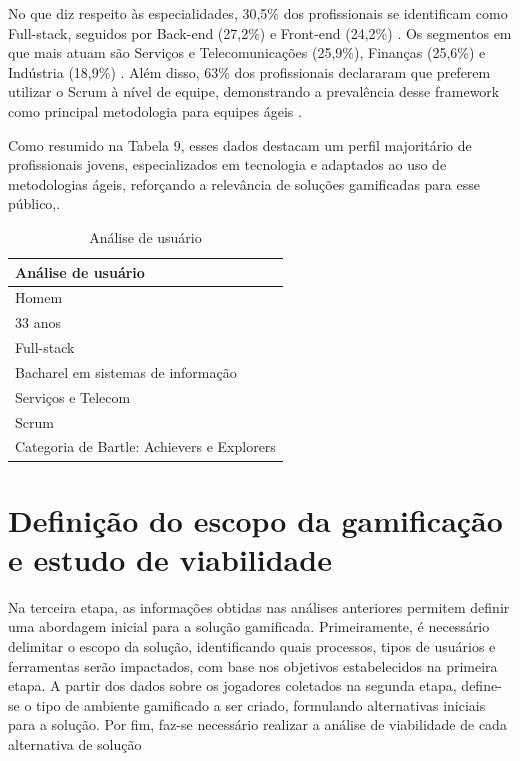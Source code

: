 \documentclass[
	12pt,
	openright,
	twoside,
	a4paper,
	english,
	brazil
	]{abntex2}
\begin{document}
No que diz respeito às especialidades, 30,5\% dos profissionais se identificam como Full-stack, seguidos por Back-end (27,2\%) e Front-end (24,2\%) \cite{revelo2021tecnologia}. Os segmentos em que mais atuam são Serviços e Telecomunicações (25,9\%), Finanças (25,6\%) e Indústria (18,9\%) \cite{abes2023mercado}. Além disso, 63\% dos profissionais declararam que preferem utilizar o Scrum à nível de equipe, demonstrando a prevalência desse framework como principal metodologia para equipes ágeis \cite{17_agile_report}.

Como resumido na Tabela 9, esses dados destacam um perfil majoritário de profissionais jovens, especializados em tecnologia e adaptados ao uso de metodologias ágeis, reforçando a relevância de soluções gamificadas para esse público,.

\begin{table}[h!]
  \centering
  \caption{Análise de usuário}
  \begin{tabular}{|p{6.5cm}|}
  \hline
  \textbf{Análise de usuário} \\ \hline
  Homem \\ \hline
  33 anos \\ \hline
  Full-stack \\ \hline
  Bacharel em sistemas de informação \\ \hline
  Serviços e Telecom \\ \hline
  Scrum \\ \hline
  Categoria de Bartle: Achievers e Explorers \\ \hline
  \end{tabular}
\end{table}

\section{Definição do escopo da gamificação e estudo de viabilidade}

Na terceira etapa, as informações obtidas nas análises anteriores permitem definir uma abordagem inicial para a solução gamificada. Primeiramente, é necessário delimitar o escopo da solução, identificando quais processos, tipos de usuários e ferramentas serão impactados, com base nos objetivos estabelecidos na primeira etapa. A partir dos dados sobre os jogadores coletados na segunda etapa, define-se o tipo de ambiente gamificado a ser criado, formulando alternativas iniciais para a solução. Por fim, faz-se necessário realizar a análise de viabilidade de cada alternativa de solução
\end{document}
